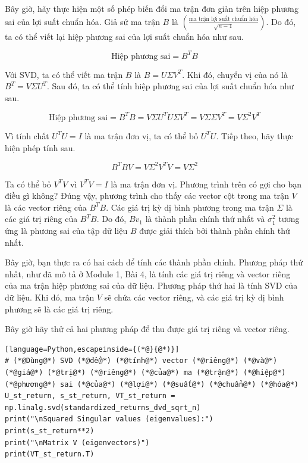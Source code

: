 Bây giờ, hãy thực hiện một số phép biến đổi ma trận đơn giản trên hiệp phương sai của lợi suất chuẩn hóa. Giả sử ma trận $B$ là $\left( \frac{\text{ma trận lợi suất chuẩn hóa}}{\sqrt{n-1}} \right)$. Do đó, ta có thể viết lại hiệp phương sai của lợi suất chuẩn hóa như sau.

\[
\text{Hiệp phương sai} = B^{T}B
\]

Với SVD, ta có thể viết ma trận $B$ là $B=U\Sigma V^{T}$. Khi đó, chuyển vị của nó là $B^{T}=V\Sigma U^{T}$. Sau đó, ta có thể tính hiệp phương sai của lợi suất chuẩn hóa như sau.

\[
\text{Hiệp phương sai} =B^{T}B=V\Sigma U^{T}U\Sigma V^{T}=V\Sigma\Sigma V^{T}=V\Sigma^{2} V^{T}
\]

Vì tính chất $U^{T}U=I$ là ma trận đơn vị, ta có thể bỏ $U^{T}U$. Tiếp theo, hãy thực hiện phép tính sau.

\[
B^{T}BV=V\Sigma^{2} V^{T}V=V\Sigma^{2}
\]

Ta có thể bỏ $V^{T}V$ vì $V^{T}V=I$ là ma trận đơn vị. Phương trình trên có gợi cho bạn điều gì không? Đúng vậy, phương trình cho thấy các vector cột trong ma trận $V$ là các vector riêng của $B^{T}B$. Các giá trị kỳ dị bình phương trong ma trận $\Sigma$ là các giá trị riêng của $B^{T}B$. Do đó, $Bv_{1}$ là thành phần chính thứ nhất và $\sigma_{1}^{2}$ tương ứng là phương sai của tập dữ liệu $B$ được giải thích bởi thành phần chính thứ nhất.

Bây giờ, bạn thực ra có hai cách để tính các thành phần chính. Phương pháp thứ nhất, như đã mô tả ở Module 1, Bài 4, là tính các giá trị riêng và vector riêng của ma trận hiệp phương sai của dữ liệu. Phương pháp thứ hai là tính SVD của dữ liệu. Khi đó, ma trận $V$ sẽ chứa các vector riêng, và các giá trị kỳ dị bình phương sẽ là các giá trị riêng.

Bây giờ hãy thử cả hai phương pháp để thu được giá trị riêng và vector riêng.

\begin{lstlisting}[language=Python,escapeinside={(*@}{@*)}]
# (*@Dùng@*) SVD (*@để@*) (*@tính@*) vector (*@riêng@*) (*@và@*) (*@giá@*) (*@trị@*) (*@riêng@*) (*@của@*) ma (*@trận@*) (*@hiệp@*) (*@phương@*) sai (*@của@*) (*@lợi@*) (*@suất@*) (*@chuẩn@*) (*@hóa@*)
U_st_return, s_st_return, VT_st_return = np.linalg.svd(standardized_returns_dvd_sqrt_n)
print("\nSquared Singular values (eigenvalues):")
print(s_st_return**2)
print("\nMatrix V (eigenvectors)")
print(VT_st_return.T)
\end{lstlisting}

